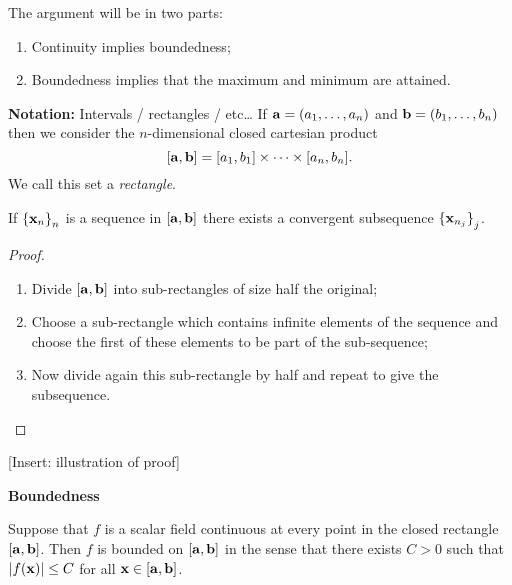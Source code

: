 The argument will be in two parts:
\begin{enumerate}
    \item Continuity implies boundedness;
    \item Boundedness implies that the maximum and minimum are attained.
\end{enumerate}

\textbf{Notation:}
Intervals / rectangles / etc\ldots
If \(\aa = (a_1,\ldots,a_n)\) and  \(\bb = (b_1,\ldots,b_n)\)
then we consider the \(n\)-dimensional closed cartesian product
\[
    [\aa,\bb] = [a_1,b_1] \times \cdots \times [a_n,b_n].
\]
We call this set a \emph{rectangle}.




\textbf{}

\begin{theorem}
    If \({\{\xx_{n}\}}_{n}\) is a sequence in \( [\aa,\bb]\)
    there exists a convergent subsequence \({\{\xx_{n_j}\}}_{j}\).
\end{theorem}




\begin{proof}
    \begin{enumerate}
        \item Divide \( [\aa,\bb]\) into sub-rectangles of size half the original;
        \item Choose a sub-rectangle which contains infinite elements of the sequence and choose the first of these elements to be part of the sub-sequence;
        \item Now divide again this sub-rectangle by half and repeat to give the subsequence.
    \end{enumerate}
\end{proof}



[Insert: illustration of proof]






\textbf{Boundedness}

\begin{theorem}
    Suppose that \(f\) is a scalar field continuous at every point in the closed rectangle \([\aa,\bb]\).
    Then \(f\) is bounded on \([\aa,\bb]\) in the sense that there exists \(C>0\) such that \(\abs{f(\xx)} \leq C\) for all \(\xx \in [\aa,\bb]\).
\end{theorem}


